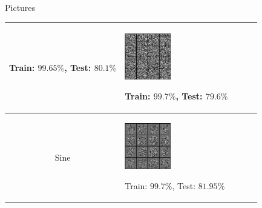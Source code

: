 \documentclass{beamer}
\begin{document}
\begin{frame}{Pictures}
\begin{table}[h!]
\begin{tabular}{ | c | m{2cm} | m{2cm} | m{2cm} | m{2cm}| }
\begin{minipage}{.3\textwidth}
\end{minipage}
\tiny
Train: $99.65\%$, Test: $80.1\%$ 
& 
\begin{minipage}{.3\textwidth}
\includegraphics[width=20mm, height=20mm]{fig5}
\end{minipage}
\tiny
Train: $99.7\%$, Test: $79.6\%$ 
& 
& 
\\ \hline
Sine
&
\begin{minipage}{.3\textwidth}
\includegraphics[width=20mm, height=20mm]{fig7}
\end{minipage}
\tiny
Train: $99.7\%$, Test: $81.95\%$ 
& 
& 
& 
\\ \hline
\end{tabular}
\end{table}
\end{frame}
\end{document}
